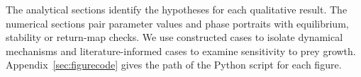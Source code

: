 The analytical sections identify the hypotheses for each qualitative result. The numerical sections pair parameter values and phase portraits with equilibrium, stability or return-map checks. We use constructed cases to isolate dynamical mechanisms and literature-informed cases to examine sensitivity to prey growth. Appendix~\ref{sec:figurecode} gives the path of the Python script for each figure.
